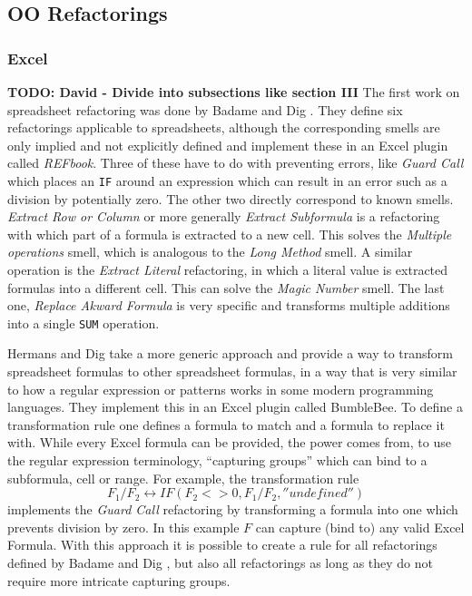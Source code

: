 \documentclass[10pt,conference,compsocconf]{IEEEtran}
\newcommand{\todo}[1]{\textbf{TODO: #1}}
\begin{document}
\subsection{OO Refactorings}

\subsubsection{Excel}
\todo{David - Divide into subsections like section III}
The first work on spreadsheet refactoring was done by Badame and Dig \cite{badame2012refactoring}.
They define six refactorings applicable to spreadsheets, although the corresponding smells are only implied and not explicitly defined and implement these in an Excel plugin called \textit{REFbook}.
Three of these have to do with preventing errors, like \textit{Guard Call} which places an \texttt{IF} around an expression which can result in an error such as a division by potentially zero.
The other two directly correspond to known smells.
\textit{Extract Row or Column} or more generally \textit{Extract Subformula} is a refactoring with which part of a formula is extracted to a new cell.
This solves the \textit{Multiple operations} smell, which is analogous to the \textit{Long Method} \cite{Hermans2012intra} smell.
A similar operation is the \textit{Extract Literal} refactoring, in which a literal value is extracted formulas into a different cell.
This can solve the \textit{Magic Number} smell.
The last one, \textit{Replace Akward Formula} is very specific and transforms multiple additions into a single \texttt{SUM} operation.

Hermans and Dig \cite{hermans2014bumblebee} take a more generic approach and provide a way to transform spreadsheet formulas to other spreadsheet formulas, in a way that is very similar to how a regular expression or patterns works in some modern programming languages.
They implement this in an Excel plugin called BumbleBee.
To define a transformation rule one defines a formula to match and a formula to replace it with. While every Excel formula can be provided, the power comes from, to use the regular expression terminology, ``capturing groups'' which can bind to a subformula, cell or range. For example, the transformation rule
\[F_1/F_2 \leftrightarrow IF(F_2<>0,F_1/F_2,''undefined'')\]
 implements the \textit{Guard Call} \cite{badame2012refactoring} refactoring by transforming a formula into one which prevents division by zero.
 In this example $F$ can capture (bind to) any valid Excel Formula.
 With this approach it is possible to create a rule for all refactorings defined by Badame and Dig \cite{badame2012refactoring}, but also all refactorings as long as they do not require more intricate capturing groups.
 
\end{document}

